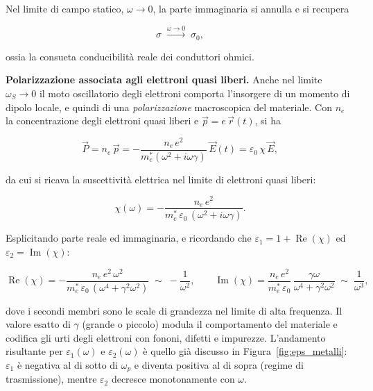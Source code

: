 Nel limite di campo statico, \( \omega \to 0 \), la parte immaginaria si annulla e si recupera

\begin{equation}
    \sigma \;\xrightarrow{\omega \to 0}\; \sigma_0,
\end{equation}

ossia la consueta conducibilità reale dei conduttori ohmici.

\textbf{Polarizzazione associata agli elettroni quasi liberi.} Anche nel limite \( \omega_S \to 0 \) il moto oscillatorio degli elettroni comporta l'insorgere di un momento di dipolo locale, e quindi di una \emph{polarizzazione} macroscopica del materiale. Con \( n_e \) la concentrazione degli elettroni quasi liberi e \( \vec{p} = e \, \vec{r}(t) \), si ha

\begin{equation}
    \vec{P} = n_e \, \vec{p} = -\frac{n_e \, e^{2}}{m_e^{*} (\omega^{2} + i \omega \gamma)} \, \vec{E}(t) = \varepsilon_0 \, \chi \, \vec{E},
\end{equation}

da cui si ricava la suscettività elettrica nel limite di elettroni quasi liberi:

\begin{equation}
    \chi(\omega) = -\frac{n_e \, e^{2}}{m_e^{*} \, \varepsilon_0 \, (\omega^{2} + i \omega \gamma)}.
\end{equation}

Esplicitando parte reale ed immaginaria, e ricordando che \( \varepsilon_1 = 1 + \operatorname{Re}(\chi) \) ed \( \varepsilon_2 = \operatorname{Im}(\chi) \):

\begin{equation}
    \operatorname{Re}(\chi) = -\frac{n_e \, e^{2} \, \omega^{2}}{m_e^{*} \, \varepsilon_0 \, (\omega^{4} + \gamma^{2} \omega^{2})} \;\sim\; -\frac{1}{\omega^{2}}, \qquad
    \operatorname{Im}(\chi) = \frac{n_e \, e^{2}}{m_e^{*} \, \varepsilon_0} \, \frac{\gamma \omega}{\omega^{4} + \gamma^{2} \omega^{2}} \;\sim\; \frac{1}{\omega^{3}},
\end{equation}

dove i secondi membri sono le scale di grandezza nel limite di alta frequenza. Il valore esatto di \( \gamma \) (grande o piccolo) modula il comportamento del materiale e codifica gli urti degli elettroni con fononi, difetti e impurezze. L'andamento risultante per \( \varepsilon_1(\omega) \) e \( \varepsilon_2(\omega) \) è quello già discusso in Figura~\ref{fig:eps_metalli}: \( \varepsilon_1 \) è negativa al di sotto di \( \omega_p \) e diventa positiva al di sopra (regime di trasmissione), mentre \( \varepsilon_2 \) decresce monotonamente con \( \omega \).

